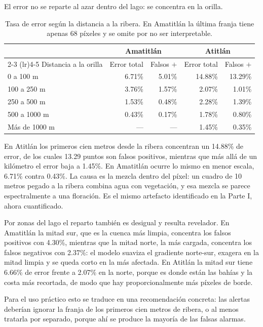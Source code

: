 \documentclass[10pt,a4paper]{article}
\begin{document}
El error no se reparte al azar dentro del lago: se concentra en la orilla.

\begin{table}[H]
  \centering
  \small
  \begin{tabular}{lrrrr}
    \toprule
    & \multicolumn{2}{c}{Amatitlán} & \multicolumn{2}{c}{Atitlán} \\
    \cmidrule(lr){2-3} \cmidrule(lr){4-5}
    Distancia a la orilla & Error total & Falsos $+$ & Error total & Falsos $+$ \\
    \midrule
    0 a 100 m      & 6.71\% & 5.01\% & 14.88\% & 13.29\% \\
    100 a 250 m    & 3.76\% & 1.57\% & 2.07\%  & 1.01\%  \\
    250 a 500 m    & 1.53\% & 0.48\% & 2.28\%  & 1.39\%  \\
    500 a 1000 m   & 0.43\% & 0.17\% & 1.78\%  & 0.80\%  \\
    Más de 1000 m  & ---    & ---    & 1.45\%  & 0.35\%  \\
    \bottomrule
  \end{tabular}
  \caption{Tasa de error según la distancia a la ribera. En Amatitlán la última franja tiene apenas 68 píxeles y
  se omite por no ser interpretable.}
\end{table}

En Atitlán los primeros cien metros desde la ribera concentran un 14.88\% de error, de los cuales 13.29 puntos son
falsos positivos, mientras que más allá de un kilómetro el error baja a 1.45\%. En Amatitlán ocurre lo mismo en
menor escala, 6.71\% contra 0.43\%. La causa es la mezcla dentro del píxel: un cuadro de 10 metros pegado a la
ribera combina agua con vegetación, y esa mezcla se parece espectralmente a una floración. Es el mismo artefacto
identificado en la Parte I, ahora cuantificado.

Por zonas del lago el reparto también es desigual y resulta revelador. En Amatitlán la mitad sur, que es la cuenca
más limpia, concentra los falsos positivos con 4.30\%, mientras que la mitad norte, la más cargada, concentra los
falsos negativos con 2.37\%: el modelo suaviza el gradiente norte-sur, exagera en la mitad limpia y se queda corto
en la más afectada. En Atitlán la mitad sur tiene 6.66\% de error frente a 2.07\% en la norte, porque es donde
están las bahías y la costa más recortada, de modo que hay proporcionalmente más píxeles de borde.

Para el uso práctico esto se traduce en una recomendación concreta: las alertas deberían ignorar la franja de los
primeros cien metros de ribera, o al menos tratarla por separado, porque ahí se produce la mayoría de las falsas
alarmas.
\end{document}
